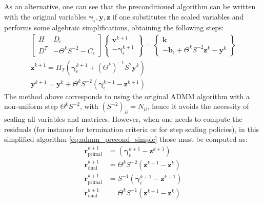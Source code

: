\documentclass[AMA,STIX1COL]{WileyNJD-v2}
\newcommand{\vect}[1]{\bm{#1}}
\begin{document}
As an alternative, one can see that the preconditioned algorithm can be written with the original variables $\vect{\gamma}_\epsilon, \vect{y}, \vect{z}$ if one substitutes the scaled variables and performs some algebraic simplifications, obtaining the following steps:
\begin{subequations}
\begin{align}
\begin{bmatrix}
			 H   & D_\epsilon \\
			 D^T & - \Theta^k S^{-2} - C_\epsilon
			\end{bmatrix}
			\begin{Bmatrix}
				\vect{v}^{k+1}  \\
			 -\vect{\gamma}_\epsilon^{k+1}
			\end{Bmatrix}
			=
			\begin{Bmatrix}
			 \vect{k} \\
			 -\vect{b}_\epsilon + \Theta^k S^{-2} \vect{z}^k - \vect{y}^k 
			\end{Bmatrix} \\
	  \vect{z}^{k+1} = \Pi_\Upsilon \left(  \vect{\gamma}_\epsilon^{k+1} +(\Theta^k)^{-1} S^{2} \vect{y}^k \right ) \\
		\vect{y}^{k+1} = \vect{y}^k + \Theta^k S^{-2} \left( \vect{\gamma}_\epsilon^{k+1} - \vect{z}^{k+1} \right)
\end{align}
\label{eq:admm_precond_simple}
\end{subequations}
%
The method above corresponds to using the original ADMM algorithm with a non-uniform step $\Theta^k S^{-2}$, with $(S^{-2})_{ii} = {N_{ii}}$, hence it avoids the necessity of scaling all variables and matrices. However, when one needs to compute the residuals (for instance for termination criteria or for step scaling policies), in this simplified algorithm \eqref{eq:admm_precond_simple} those must be computed as:
%
\begin{align}
\vect{r}_{\text{primal}}^{k+1} &= \left( \vect{\gamma}_\epsilon^{k+1}-\vect{z}^{k+1} \right) \nonumber \\
\vect{r}_{\text{dual}}^{k+1}   &= \Theta^k S^{-2} (\vect{z}^{k+1} - \vect{z}^{k}) \nonumber \\
\breve{\vect{r}}_{\text{primal}}^{k+1} &= S^{-1} \left( \vect{\gamma}_\epsilon^{k+1}-\vect{z}^{k+1} \right) \nonumber \\
\breve{\vect{r}}_{\text{dual}}^{k+1}   &= \Theta^k S^{-1} (\vect{z}^{k+1} - \vect{z}^{k}) \nonumber
\end{align}
\end{document}
